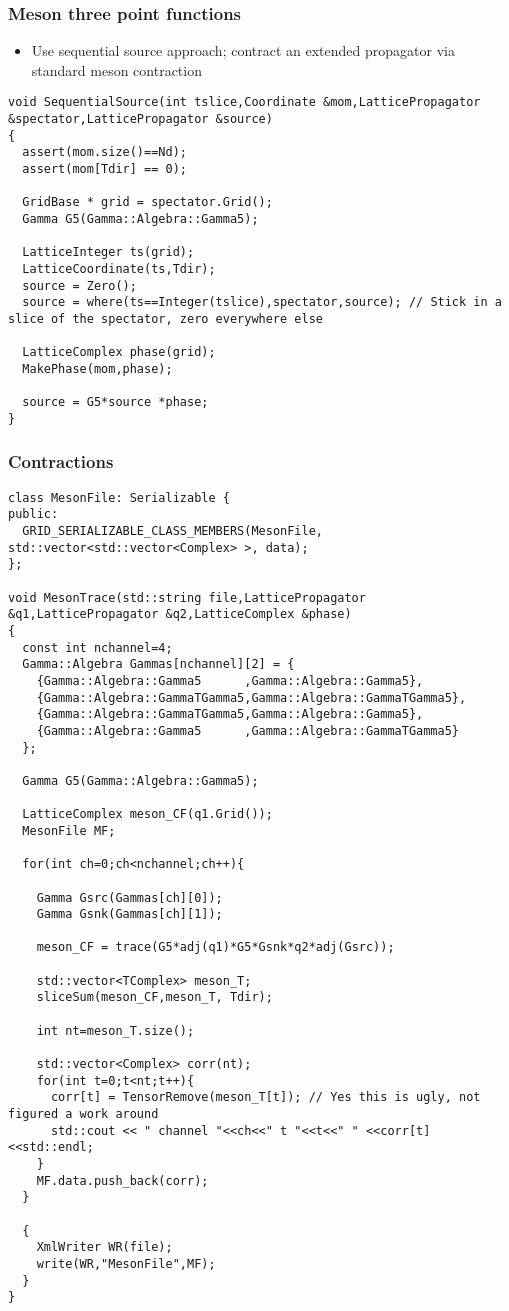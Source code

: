 \documentclass[pdf,ps,8pt]{beamer}
\newcommand{\miniscule}{\fontsize{3pt}{4pt}\selectfont}
\begin{document}
\begin{frame}[fragile]\small\frametitle{ Meson three point functions }

  \begin{itemize}
    \item Use sequential source approach; contract an extended propagator via standard meson contraction
    \end{itemize}
{\tiny
\begin{verbatim}
void SequentialSource(int tslice,Coordinate &mom,LatticePropagator &spectator,LatticePropagator &source)
{
  assert(mom.size()==Nd);
  assert(mom[Tdir] == 0);

  GridBase * grid = spectator.Grid();
  Gamma G5(Gamma::Algebra::Gamma5);

  LatticeInteger ts(grid);
  LatticeCoordinate(ts,Tdir);
  source = Zero();
  source = where(ts==Integer(tslice),spectator,source); // Stick in a slice of the spectator, zero everywhere else

  LatticeComplex phase(grid);
  MakePhase(mom,phase);

  source = G5*source *phase;
}
\end{verbatim}
}  

\end{frame}

\begin{frame}[fragile]\small\frametitle{ Contractions }
{\miniscule
\begin{verbatim}
class MesonFile: Serializable {
public:
  GRID_SERIALIZABLE_CLASS_MEMBERS(MesonFile, std::vector<std::vector<Complex> >, data);
};

void MesonTrace(std::string file,LatticePropagator &q1,LatticePropagator &q2,LatticeComplex &phase)
{
  const int nchannel=4;
  Gamma::Algebra Gammas[nchannel][2] = {
    {Gamma::Algebra::Gamma5      ,Gamma::Algebra::Gamma5},
    {Gamma::Algebra::GammaTGamma5,Gamma::Algebra::GammaTGamma5},
    {Gamma::Algebra::GammaTGamma5,Gamma::Algebra::Gamma5},
    {Gamma::Algebra::Gamma5      ,Gamma::Algebra::GammaTGamma5}
  };

  Gamma G5(Gamma::Algebra::Gamma5);

  LatticeComplex meson_CF(q1.Grid());
  MesonFile MF;

  for(int ch=0;ch<nchannel;ch++){

    Gamma Gsrc(Gammas[ch][0]);
    Gamma Gsnk(Gammas[ch][1]);

    meson_CF = trace(G5*adj(q1)*G5*Gsnk*q2*adj(Gsrc));

    std::vector<TComplex> meson_T;
    sliceSum(meson_CF,meson_T, Tdir);

    int nt=meson_T.size();

    std::vector<Complex> corr(nt);
    for(int t=0;t<nt;t++){
      corr[t] = TensorRemove(meson_T[t]); // Yes this is ugly, not figured a work around
      std::cout << " channel "<<ch<<" t "<<t<<" " <<corr[t]<<std::endl;
    }
    MF.data.push_back(corr);
  }

  {
    XmlWriter WR(file);
    write(WR,"MesonFile",MF);
  }
}
\end{verbatim}
}  
\end{frame}
\end{document}
